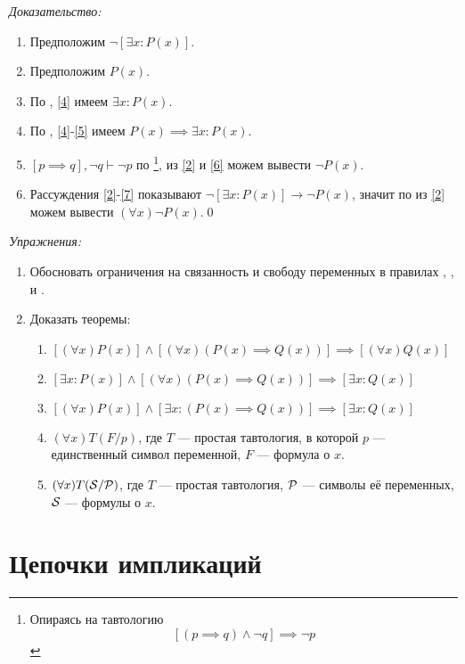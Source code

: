 {\it Доказательство:}
\begin{enumerate}[label=(\arabic*)]
	\item{}\label{2}Предположим $\lnot [\exists x:P(x)]$.
	\item{}\label{4}Предположим $P(x)$.
	\item{}\label{5}По \Eii{}, \ref{4} имеем $\exists x:P(x)$.
	\item{}\label{6}По \implic{}, \ref{4}-\ref{5} имеем
		$P(x)\implies \exists x:P(x)$.
	\item{}\label{7}${[p\implies q],\lnot q\vdash \lnot p}$ по \taut{}\footnote{
			Опираясь на тавтологию
			\[
				[(p\implies q)\land\lnot q]\implies\lnot p
			\]
		}, из
		\ref{2} и \ref{6} можем вывести $\lnot P(x)$.
	\item{}\label{8}Рассуждения \ref{2}-\ref{7} показывают
		$\lnot[\exists x:P(x)]\to\lnot P(x)$, значит по \Aii{} из \ref{2} можем
		вывести $(\forall x)\lnot P(x)$.\qed
\end{enumerate}

\pagebreak
{\it Упражнения:}
\begin{enumerate}
	\item{}Обосновать ограничения на связанность и свободу переменных в правилах
		\Aii{}, \Aee{}, \Eii{} и \Eee{}.
	\item{}\label{ex:obv_thm}Доказать теоремы:
		\begin{enumerate}
			\item{}$[(\forall x)P(x)]\land[(\forall x)(P(x)\implies Q(x))]
				\implies [(\forall x)Q(x)]$\label{thm:obv_forall}
			\item{}$[\exists x:P(x)]\land[(\forall x)(P(x)\implies Q(x))]
				\implies [\exists x:Q(x)]$
			\item{}$[(\forall x)P(x)]\land [\exists x:(P(x)\implies Q(x))]
				\implies [\exists x:Q(x)]$
			\item{}$(\forall x)T(F/p)$, где $T$ --- простая тавтология,
				в которой $p$ --- единственный символ переменной, $F$ --- формула о $x$.
			\item{}$(\forall x)T(\mathcal S/\mathcal P)$, где $T$ --- простая тавтология,
				$\mathcal P$ --- символы её переменных, $\mathcal S$ --- формулы о $x$.\label{thm:obv_taut}
		\end{enumerate}
\end{enumerate}

\section{Цепочки импликаций}

